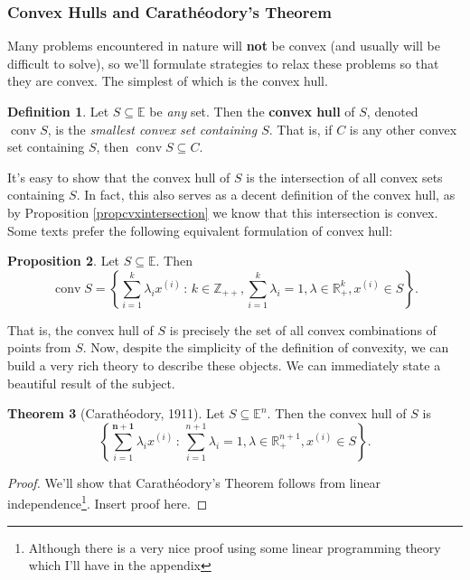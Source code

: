 \documentclass[11pt]{article}
\numberwithin{equation}{section}
\theoremstyle{definition}
\newtheorem{theorem}{Theorem}[section]
\newtheorem{proposition}[theorem]{Proposition}
\newtheorem{definition}[theorem]{Definition}%
\newcommand{\bE}{\mathbb{E}}
\newcommand{\bR}{\mathbb{R}}
\newcommand{\bZ}{\mathbb{Z}}
\newcommand{\set}[2]{\left\{#1\,:\,#2\right\}}
\newcommand{\conv}{\operatorname{conv}}
\begin{document}
\subsubsection{Convex Hulls and Carath\'eodory's Theorem}
Many problems encountered in nature will \textbf{not} be convex (and usually will be difficult to solve), so we'll formulate strategies to relax these problems so that they are convex. The simplest of which is the convex hull.
\begin{definition}
    Let $S\subseteq\bE$ be \textit{any} set. Then the \textbf{convex hull} of $S$, denoted $\conv S$, is the \textit{smallest convex set containing $S$}. That is, if $C$ is any other convex set containing $S$, then $\conv S\subseteq C$.
\end{definition}
It's easy to show that the convex hull of $S$ is the intersection of all convex sets containing $S$. In fact, this also serves as a decent definition of the convex hull, as by Proposition \ref{propcvxintersection} we know that this intersection is convex. Some texts prefer the following equivalent formulation of convex hull:
\begin{proposition}
    Let $S\subseteq\bE$. Then
    \begin{equation}
        \conv S=\set{\sum_{i=1}^k\lambda_ix^{(i)}}{k\in \bZ_{++}, \sum_{i=1}^k\lambda_i=1, \lambda\in \bR_+^k, x^{(i)}\in S}.
    \end{equation}
\end{proposition}
That is, the convex hull of $S$ is precisely the set of all convex combinations of points from $S$. Now, despite the simplicity of the definition of convexity, we can build a very rich theory to describe these objects.
We can immediately state a beautiful result of the subject.
\begin{theorem}[Carath\'eodory, 1911]
    \label{thmcaratheodory}%
    Let $S\subseteq\bE^n$. Then the convex hull of $S$ is
    \begin{equation}
        \label{thmcaratheodoryeq}
        \set{\sum_{i=1}^{\mathbf{n+1}}\lambda_ix^{(i)}}{ \sum_{i=1}^{n+1}\lambda_i=1, \lambda\in \bR_+^{n+1}, x^{(i)}\in S}.
    \end{equation}
\end{theorem}
\begin{proof}
    We'll show that Carath\'eodory's Theorem follows from linear independence\footnote{Although there is a very nice proof using some linear programming theory which I'll have in the appendix}. Insert proof here.
\end{proof}
\end{document}
